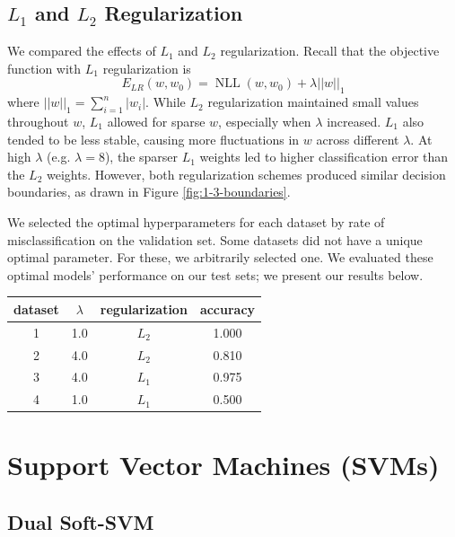 \documentclass{article}
\DeclareMathOperator{\NLL}{NLL}
\begin{document}
\begin{multicols}{2}
\subsection{$L_1$ and $L_2$ Regularization}
We compared the effects of $L_1$ and $L_2$ regularization.
Recall that the objective function with $L_1$ regularization is
\begin{equation}
    E_{LR}(w, w_0) = \NLL(w, w_0) + \lambda ||w||_1
\end{equation}
where $||w||_1 = \sum_{i=1}^n{|w_i|}$. 
While $L_2$ regularization maintained small values throughout $w$, $L_1$ allowed for sparse $w$, especially when $\lambda$ increased. $L_1$ also tended to be less stable, causing more fluctuations in $w$ across different $\lambda$. At high $\lambda$ (e.g. $\lambda = 8$), the sparser $L_1$ weights led to higher classification error than the $L_2$ weights. However, both regularization schemes produced similar decision boundaries, as drawn in Figure \ref{fig:1-3-boundaries}.

We selected the optimal hyperparameters for each dataset
by rate of misclassification on the validation set.
Some datasets did not have a unique optimal parameter.
For these, we arbitrarily selected one.
We evaluated these optimal models' performance on our test sets;
we present our results below.
\begin{center}
\begin{tabular}{|c||c|c|c|}
\hline
dataset & $\lambda$	& regularization		 & accuracy \\\hline
        1	& 1.0 & $L_2$ & 1.000\\
        2	& 4.0 & $L_2$ & 0.810 \\
        3	& 4.0 & $L_1$ & 0.975 \\
        4	& 1.0 & $L_1$ & 0.500 \\\hline
\end{tabular}
\end{center}



\section{Support Vector Machines (SVMs)}
\label{sec:svm}

\subsection{Dual Soft-SVM}


\end{multicols}
\end{document}
